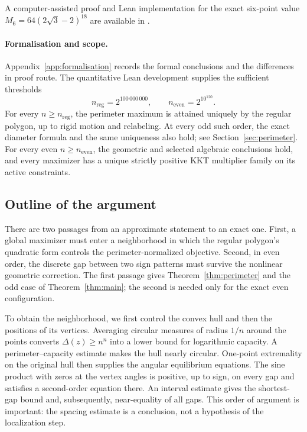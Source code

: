 \documentclass[11pt,reqno]{amsart}
\numberwithin{equation}{section}
\theoremstyle{definition}
\theoremstyle{remark}
\begin{document}
A computer-assisted proof and Lean implementation for the exact six-point value $M_6=64(2\sqrt3-2)^{18}$ are available in \cite{coleski-six}.

\paragraph{Formalisation and scope.}
Appendix~\ref{app:formalisation} records the formal conclusions and the differences in proof route. The quantitative Lean development supplies the sufficient thresholds
\[
 n_{\mathrm{reg}}=2^{100\,000\,000},\qquad
 n_{\mathrm{even}}=2^{10^{120}}.
\]
For every $n\ge n_{\mathrm{reg}}$, the perimeter maximum is attained uniquely by the regular polygon, up to rigid motion and relabeling. At every odd such order, the exact diameter formula and the same uniqueness also hold; see Section~\ref{sec:perimeter}. For every even $n\ge n_{\mathrm{even}}$, the geometric and selected algebraic conclusions hold, and every maximizer has a unique strictly positive KKT multiplier family on its active constraints.

\subsection{Outline of the argument}
There are two passages from an approximate statement to an exact one. First, a global maximizer must enter a neighborhood in which the regular polygon's quadratic form controls the perimeter-normalized objective. Second, in even order, the discrete gap between two sign patterns must survive the nonlinear geometric correction. The first passage gives Theorem~\ref{thm:perimeter} and the odd case of Theorem~\ref{thm:main}; the second is needed only for the exact even configuration.

To obtain the neighborhood, we first control the convex hull and then the positions of its vertices. Averaging circular measures of radius $1/n$ around the points converts $\Delta(z)\ge n^n$ into a lower bound for logarithmic capacity. A perimeter--capacity estimate makes the hull nearly circular. One-point extremality on the original hull then supplies the angular equilibrium equations. The sine product with zeros at the vertex angles is positive, up to sign, on every gap and satisfies a second-order equation there. An interval estimate gives the shortest-gap bound and, subsequently, near-equality of all gaps. This order of argument is important: the spacing estimate is a conclusion, not a hypothesis of the localization step.
\end{document}
